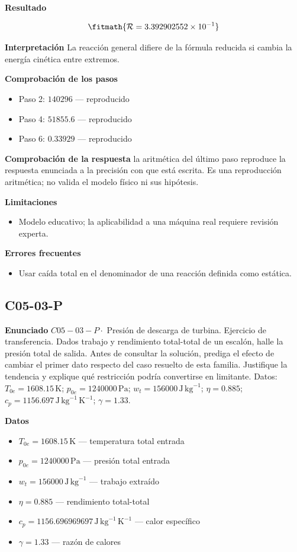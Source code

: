 \documentclass[10pt,openany]{book}
\begin{document}
\noindent\textbf{Resultado}

\[
\fitmath{\mathcal R=3.392902552\times10^{-1}}
\]

\noindent\textbf{Interpretación}
La reacción general difiere de la fórmula reducida si cambia la energía cinética entre extremos.

\noindent\textbf{Comprobación de los pasos}
\begin{itemize}
\item Paso 2: $140296$ — reproducido
\item Paso 4: $51855.6$ — reproducido
\item Paso 6: $0.33929$ — reproducido
\end{itemize}

\noindent\textbf{Comprobación de la respuesta} la aritmética del último paso reproduce la respuesta enunciada a la precisión con que está escrita. Es una reproducción aritmética; no valida el modelo físico ni sus hipótesis.

\noindent\textbf{Limitaciones}
\begin{itemize}
\item Modelo educativo; la aplicabilidad a una máquina real requiere revisión experta.
\end{itemize}

\noindent\textbf{Errores frecuentes}
\begin{itemize}
\item Usar caída total en el denominador de una reacción definida como estática.
\end{itemize}
\subsection*{C05-03-P}

\noindent\textbf{Enunciado}
\(C05-03-P \cdot\) Presión de descarga de turbina. Ejercicio de transferencia. Dados trabajo y rendimiento total-total de un escalón, halle la presión total de salida. Antes de consultar la solución, prediga el efecto de cambiar el primer dato respecto del caso resuelto de esta familia. Justifique la tendencia y explique qué restricción podría convertirse en limitante. Datos: \(T_{0e}=1608.15\, \mathrm{K}\); \(p_{0e}=1240000\, \mathrm{Pa}\); \(w_t=156000\, \mathrm{J}\,\mathrm{kg}^{-1}\); \(\eta=0.885\); \(c_p=1156.697\, \mathrm{J}\,\mathrm{kg}^{-1}\,\mathrm{K}^{-1}\); \(\gamma=1.33\).

\noindent\textbf{Datos}
\begin{itemize}
\item $T_{0e} = 1608.15\,\mathrm{K}$ — temperatura total entrada
\item $p_{0e} = 1240000\,\mathrm{Pa}$ — presión total entrada
\item $w_t = 156000\,\mathrm{J}\,\mathrm{kg}^{-1}$ — trabajo extraído
\item $\eta = 0.885$ — rendimiento total-total
\item $c_p = 1156.696969697\,\mathrm{J}\,\mathrm{kg}^{-1}\,\mathrm{K}^{-1}$ — calor específico
\item $\gamma = 1.33$ — razón de calores
\end{itemize}
\end{document}
